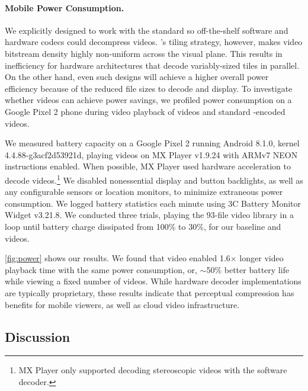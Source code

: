\paragraph{Mobile Power Consumption.}
We explicitly designed \name to work with the \hevc{} standard so off-the-shelf software and hardware codecs could decompress \name videos.
\nameCompress's tiling strategy, however, makes video bitstream density highly non-uniform across the visual plane.
This results in inefficiency for hardware architectures that decode variably-sized tiles in parallel.
On the other hand, even such designs will achieve a higher overall power efficiency because of the reduced file sizes to decode and display.
To investigate whether \name videos can achieve power savings, we profiled power consumption on a Google Pixel 2 phone during video playback of \name videos and standard \hevc-encoded videos.


We measured battery capacity on a Google Pixel 2 running Android 8.1.0, kernel 4.4.88-g3acf2d53921d, playing videos on MX Player v1.9.24 with ARMv7 NEON instructions enabled.
When possible, MX Player used hardware acceleration to decode videos.\footnote{MX Player only supported decoding stereoscopic videos with the software decoder.}
We disabled nonessential display and button backlights, as well as any configurable sensors or location monitors, to minimize extraneous power consumption.
We logged battery statistics each minute using 3C Battery Monitor Widget v3.21.8.
We conducted three trials, playing the 93-file video library in a loop until battery charge dissipated from 100\% to 30\%, for our \hevc baseline and \name videos.

\ref{fig:power} shows our results.
We found that \name video enabled 1.6$\times$ longer video playback time with the same power consumption, or, $\sim$50\% better battery life while viewing a fixed number of videos.
While hardware decoder implementations are typically proprietary, these results indicate that perceptual compression has benefits for mobile viewers, as well as cloud video infrastructure.

\subsection{Discussion}

